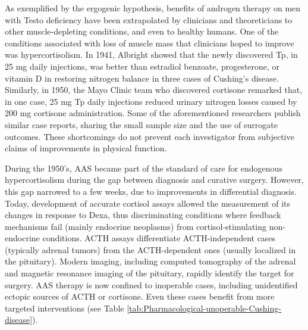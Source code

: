 \documentclass[12pt,english]{report}\usepackage[]{graphicx}\usepackage[]{color}
\begin{document}
As exemplified by the ergogenic hypothesis, benefits of androgen therapy
on men with Testo deficiency have been extrapolated by clinicians
and theoreticians to other muscle-depleting conditions, and even to
healthy humans. One of the conditions associated with loss of muscle
mass that clinicians hoped to improve was hypercortisolism. In 1941,
Albright showed that the newly discovered Tp, in 25 mg daily injections,
was better than estradiol benzoate, progesterone, or vitamin D in
restoring nitrogen balance in three cases of Cushing's disease\citep{albright1941cushings}.
Similarly, in 1950, the Mayo Clinic team who discovered cortisone
remarked that, in one case, 25 mg Tp daily injections reduced urinary
nitrogen losses caused by 200 mg cortisone administration\citep{sprague1950observations}.
Some of the aforementioned researchers publish similar case reports,
sharing the small sample size and the use of surrogate outcomes\citep{keutmann1948metabolic}.
These shortcomings do not prevent each investigator from subjective
claims of improvements in physical function.

During the 1950's, AAS became part of the standard of care for endogenous
hypercortisolism during the gap between diagnosis and curative surgery.
However, this gap narrowed to a few weeks, due to improvements in
differential diagnosis. Today, development of accurate cortisol assays
allowed the measurement of its changes in response to Dexa, thus discriminating
conditions where feedback mechanisms fail (mainly endocrine neoplasms)
from cortisol-stimulating non-endocrine conditions. ACTH assays differentiate
ACTH-independent cases (typically adrenal tumors) from the ACTH-dependent
ones (usually localized in the pituitary). Modern imaging, including
computed tomography of the adrenal and magnetic resonance imaging
of the pituitary, rapidly identify the target for surgery. AAS therapy
is now confined to inoperable cases, including unidentified ectopic
sources of ACTH or cortisone. Even these cases benefit from more targeted
interventions (see Table \ref{tab:Pharmacological-unoperable-Cushing-disease}).
\end{document}
